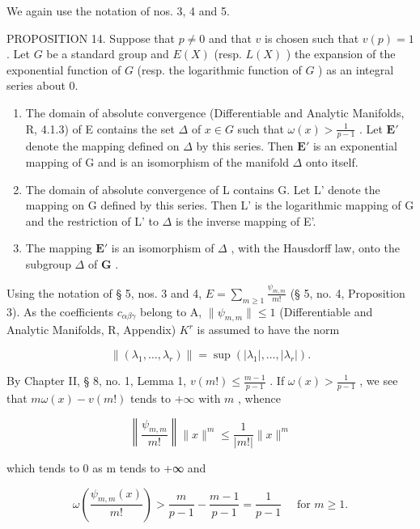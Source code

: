 We again use the notation of nos. 3, 4 and 5.

PROPOSITION 14. Suppose that \(p \neq 0\) and that \(v\) is chosen such that \(v(p) = 1\) . Let \(G\) be a standard group and \(E(X)\) (resp. \(L(X)\) ) the expansion of the exponential function of \(G\) (resp. the logarithmic function of \(G\) ) as an integral series about 0.

\begin{enumerate}
\def\labelenumi{(\roman{enumi})}
\item
  The domain of absolute convergence (Differentiable and Analytic Manifolds, R, 4.1.3) of E contains the set \(\Delta\) of \(x \in G\) such that \(\omega(x) > \frac{1}{p - 1}\) . Let \(\mathbf{E}'\) denote the mapping defined on \(\Delta\) by this series. Then \(\mathbf{E}'\) is an exponential mapping of G and is an isomorphism of the manifold \(\Delta\) onto itself.
\item
  The domain of absolute convergence of L contains G. Let L' denote the mapping on G defined by this series. Then L' is the logarithmic mapping of G and the restriction of L' to \(\Delta\) is the inverse mapping of E'.
\item
  The mapping \(\mathbf{E}'\) is an isomorphism of \(\Delta\) , with the Hausdorff law, onto the subgroup \(\Delta\) of \(\mathbf{G}\) .
\end{enumerate}

Using the notation of § 5, nos. 3 and 4, \(E = \sum_{m \geqslant 1} \frac{\psi_{m,m}}{m!}\) (§ 5, no. 4, Proposition 3). As the coefficients \(c_{\alpha\beta\gamma}\) belong to A, \(\|\psi_{m,m}\| \leqslant 1\) (Differentiable and Analytic Manifolds, R, Appendix) \(K^{r}\) is assumed to have the norm

\[
\left\| \left(\lambda_ {1}, \dots , \lambda_ {r}\right) \right\| = \sup \left(\left| \lambda_ {1} \right|, \dots , \left| \lambda_ {r} \right|\right).
\]

By Chapter II, § 8, no. 1, Lemma 1, \(v(m!) \leqslant \frac{m - 1}{p - 1}\) . If \(\omega(x) > \frac{1}{p - 1}\) , we see that \(m\omega(x) - v(m!)\) tends to \(+\infty\) with \(m\) , whence

\[
\left\| \frac {\psi_ {m , m}}{m !} \right\| \| x \| ^ {m} \leqslant \frac {1}{| m ! |} \| x \| ^ {m}
\]

which tends to 0 as m tends to +∞ and

\[
\omega \left(\frac {\psi_ {m , m} (x)}{m !}\right) > \frac {m}{p - 1} - \frac {m - 1}{p - 1} = \frac {1}{p - 1} \quad \text { for } m \geqslant 1.
\]

